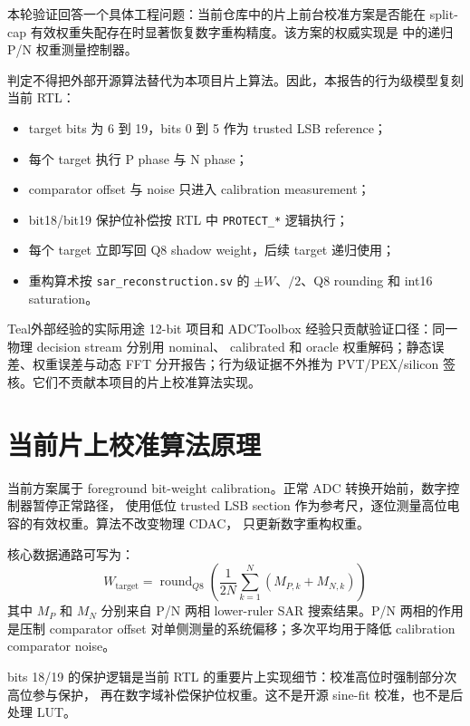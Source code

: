 \documentclass[UTF8,a4paper,11pt,fontset=windows]{ctexart}
\begin{document}
本轮验证回答一个具体工程问题：当前仓库中的片上前台校准方案是否能在 split-cap
有效权重失配存在时显著恢复数字重构精度。该方案的权威实现是
 中的递归 P/N 权重测量控制器。

判定不得把外部开源算法替代为本项目片上算法。因此，本报告的行为级模型复刻当前 RTL：
\begin{itemize}
  \item target bits 为 6 到 19，bits 0 到 5 作为 trusted LSB reference；
  \item 每个 target 执行 P phase 与 N phase；
  \item comparator offset 与 noise 只进入 calibration measurement；
  \item bit18/bit19 保护位补偿按 RTL 中 \texttt{PROTECT\_*} 逻辑执行；
  \item 每个 target 立即写回 Q8 shadow weight，后续 target 递归使用；
  \item 重构算术按 \texttt{sar\_reconstruction.sv} 的 \(\pm W\)、\(/\!2\)、Q8 rounding 和 int16 saturation。
\end{itemize}

\begin{verdictbox}{Teal}{外部经验的实际用途}
12-bit 项目和 ADCToolbox 经验只贡献验证口径：同一物理 decision stream 分别用 nominal、
calibrated 和 oracle 权重解码；静态误差、权重误差与动态 FFT 分开报告；行为级证据不外推为
PVT/PEX/silicon 签核。它们不贡献本项目的片上校准算法实现。
\end{verdictbox}

\section{当前片上校准算法原理}

当前方案属于 foreground bit-weight calibration。正常 ADC 转换开始前，数字控制器暂停正常路径，
使用低位 trusted LSB section 作为参考尺，逐位测量高位电容的有效权重。算法不改变物理 CDAC，
只更新数字重构权重。

核心数据通路可写为：
\[
  W_{\mathrm{target}} =
  \operatorname{round}_{Q8}
  \left(
    \frac{1}{2N}
    \sum_{k=1}^{N}
    \left(M_{P,k} + M_{N,k}\right)
  \right)
\]
其中 \(M_P\) 和 \(M_N\) 分别来自 P/N 两相 lower-ruler SAR 搜索结果。P/N 两相的作用是压制
comparator offset 对单侧测量的系统偏移；多次平均用于降低 calibration comparator noise。

bits 18/19 的保护逻辑是当前 RTL 的重要片上实现细节：校准高位时强制部分次高位参与保护，
再在数字域补偿保护位权重。这不是开源 sine-fit 校准，也不是后处理 LUT。
\end{document}
